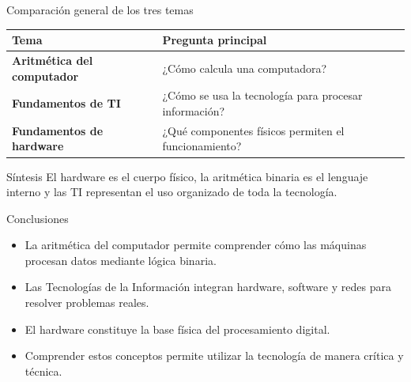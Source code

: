 \documentclass[10pt,aspectratio=169]{beamer}
\begin{document}
	
	\begin{frame}{Comparación general de los tres temas}
		
		\small
		
		\begin{center}
			
			\begin{tabular}{>{\bfseries}p{3cm} p{8cm}}
				
				\toprule
				
				Tema & Pregunta principal \\
				
				\midrule
				
				Aritmética del computador & ¿Cómo calcula una computadora? \\
				
				Fundamentos de TI & ¿Cómo se usa la tecnología para procesar información? \\
				
				Fundamentos de hardware & ¿Qué componentes físicos permiten el funcionamiento? \\
				
				\bottomrule
				
			\end{tabular}
			
		\end{center}
		
		\vspace{0.4cm}
		
		\begin{block}{Síntesis}
			El hardware es el cuerpo físico, la aritmética binaria es el lenguaje interno y las TI representan el uso organizado de toda la tecnología.
		\end{block}
		
	\end{frame}
	
	
	\begin{frame}{Conclusiones}
		
		\begin{itemize}
			\item La aritmética del computador permite comprender cómo las máquinas procesan datos mediante lógica binaria.
			\item Las Tecnologías de la Información integran hardware, software y redes para resolver problemas reales.
			\item El hardware constituye la base física del procesamiento digital.
			\item Comprender estos conceptos permite utilizar la tecnología de manera crítica y técnica.
		\end{itemize}
		
	\end{frame}
	
\end{document}
